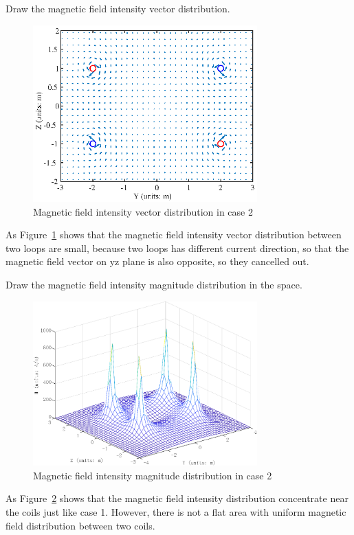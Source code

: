 \documentclass[10pt, journal, final]{IEEEtran}
\begin{document}
Draw the magnetic field intensity vector distribution.

\begin{figure}[htbp]
    \centering
    \includegraphics[width = 3.4in]{figures/work2.1.eps}
    \caption{Magnetic field intensity vector distribution in case 2}
    \label{fig:2.1}
\end{figure}
As Figure~\ref{fig:2.1} shows that the magnetic field intensity vector distribution between two loops are small, 
because two loops has different current direction, so that the magnetic field vector on yz plane is also opposite, 
so they cancelled out.\\\par

Draw the magnetic field intensity magnitude distribution in the space.


\begin{figure}[htbp]
    \centering
    \includegraphics[width = 3.4in]{figures/work2.2.eps}
    \caption{Magnetic field intensity magnitude distribution in case 2}
    \label{fig:2.2}
\end{figure}
As Figure~\ref{fig:2.2} shows that the magnetic field intensity distribution concentrate near the coils just like case 1.
However, there is not a flat area with uniform magnetic field distribution between two coils.\\\par
\end{document}
